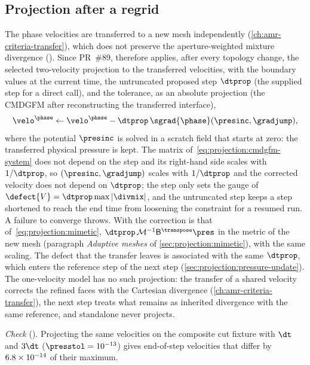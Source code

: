 \subsection{Projection after a regrid}\label{sec:projection:regrid}
The phase velocities are transferred to a new mesh independently
(\cref{ch:amr-criteria-transfer}), which does not preserve the
aperture-weighted mixture divergence (). Since PR~\#89,
 therefore applies, after every topology
change, the selected two-velocity projection to the transferred velocities,
with the boundary values at the current time, the untruncated proposed step
$\dtprop$ (the supplied step for a direct call), and the tolerance, as an
absolute projection (the CMDGFM after reconstructing the transferred
interface),
\begin{equation}\label{eq:projection:regrid}
  \velo^{\phase}\leftarrow\velo^{\phase}-\dtprop\,\sgrad{\phase}(\presinc,\gradjump),
\end{equation}
where the potential $\presinc$ is solved in a scratch field that starts at
zero: the transferred physical pressure is kept. The matrix of~\cref{eq:projection:cmdgfm-system}
does not depend on the step and its right-hand side scales with $1/\dtprop$,
so $(\presinc,\gradjump)$ scales with $1/\dtprop$ and the corrected
velocity does not depend on $\dtprop$; the step only sets the gauge of
$\defect{V}=\dtprop\max\abs{\divmix}$, and the untruncated step keeps a step
shortened to reach the end time from loosening the constraint for a resumed
run. A failure to converge throws. With  the
correction is that of~\cref{eq:projection:mimetic}, $\dtprop\,\mathcal M^{-1}\mathsf B^{\transpose}\pres$
in the metric of the new mesh (paragraph \emph{Adaptive meshes} of
\cref{sec:projection:mimetic}), with the same scaling. The defect that the transfer leaves is
associated with the same $\dtprop$, which enters the reference step of the
next step (\cref{sec:projection:pressure-update}). The one-velocity model has
no such projection: the transfer of a shared velocity corrects the refined
faces with the Cartesian divergence (\cref{ch:amr-criteria-transfer}), the
next step treats what remains as inherited divergence with the same
reference, and standalone  never projects.

\emph{Check} (). Projecting the same velocities
on the composite cut fixture with $\dt$ and $3\dt$ ($\presstol=10^{-13}$)
gives end-of-step velocities that differ by $6.8\times10^{-14}$ of their
maximum.

